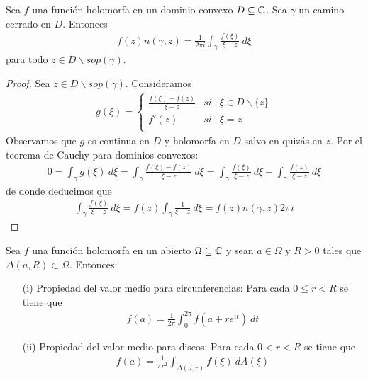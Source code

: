 \begin{teo}
    Sea $f$ una función holomorfa en un dominio convexo $D \subseteq \mathbb{C}$. Sea $\gamma$ un camino cerrado en $D$. Entonces
    \begin{align*}
        f(z)n(\gamma,z) = \frac{1}{2\pi i}\int_{\gamma}{\frac{f(\xi)}{\xi - z} \ d\xi}
    \end{align*}
    para todo $z \in D \backslash sop(\gamma)$.
\end{teo}

\begin{proof}
    Sea $z \in D \backslash sop(\gamma)$. Consideramos
    \begin{align*}
        g(\xi) = \left\{ \begin{array}{lcc}
                             \frac{f(\xi) - f(z)}{\xi - z} & si & \xi \in D \backslash \{z\} \\
                             f'(z)                         & si & \xi = z                    \\
                         \end{array}
        \right.
    \end{align*}
    Observamos que $g$ es continua en $D$ y holomorfa en $D$ salvo en quizás en $z$. Por el teorema de Cauchy para dominios convexos:
    \begin{align*}
        0 = \int_{\gamma}{g(\xi) \ d\xi} = \int_{\gamma}{\frac{f(\xi) - f(z)}{\xi - z} \ d\xi} = \int_{\gamma}{\frac{f(\xi)}{\xi - z} \ d\xi} - \int_{\gamma}{\frac{f(z)}{\xi - z} \ d\xi}
    \end{align*}
    de donde deducimos que
    \begin{align*}
        \int_{\gamma}{\frac{f(\xi)}{\xi - z} \ d\xi} = f(z)\int_{\gamma}{\frac{1}{\xi - z} \ d\xi} = f(z)n(\gamma,z)2\pi i
    \end{align*}
\end{proof}

\begin{teo}
    Sea $f$ una función holomorfa en un abierto $\Omega \subseteq \mathbb{C}$ y sean $a \in \Omega$ y $R > 0$ tales que $\Delta(a,R) \subset \Omega$. Entonces:
    \begin{enumerate}
        \item[(i)] Propiedad del valor medio para circunferencias: Para cada $0 \leq r < R$ se tiene que
              \begin{align*}
                  f(a) = \frac{1}{2\pi}\int_{0}^{2\pi}{f\left(a + re^{it}\right) \ dt}
              \end{align*}
        \item[(ii)] Propiedad del valor medio para discos: Para cada $0 < r < R$ se tiene que
              \begin{align*}
                  f(a) = \frac{1}{\pi r^2}\int_{\Delta(a,r)}{f(\xi) \ dA(\xi)}
              \end{align*}
    \end{enumerate}
\end{teo}

